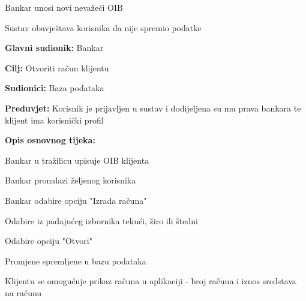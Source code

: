 \begin{packed_item}
\begin{packed_item}
\begin{packed_enum}
                  		
                  	\end{packed_enum}
                
                    \item[3.a] Bankar unosi novi nevažeći OIB
                    \item[] \begin{packed_enum}
                      
                      \item Sustav obavještava korisnika da nije spremio podatke
                      
                    \end{packed_enum}
                  
                \end{packed_item}
            \end{packed_item}
        
        
                
               \noindent {}
                \begin{packed_item}
            
                  \item \textbf{Glavni sudionik: }Bankar
                  \item  \textbf{Cilj:} Otvoriti račun klijentu
                  \item  \textbf{Sudionici:} Baza podataka
                  \item  \textbf{Preduvjet:} Korisnik je prijavljen u sustav i dodijeljena su mu prava bankara te klijent ima korisnički profil
                  \item  \textbf{Opis osnovnog tijeka:}
                  
                  \item[] \begin{packed_enum}
                
                	\item Bankar u tražilicu upisuje OIB klijenta
                	\item Bankar pronalazi željenog korisnika
                    \item Bankar odabire opciju "Izrada računa" 
                    \item Odabire iz padajućeg izbornika tekući, žiro ili štedni
                    \item Odabire opciju "Otvori"
                    \item Promjene spremljene u bazu podataka                 
                    \item Klijentu se omogućuje prikaz računa u aplikaciji - broj računa i iznos sredstava na računu
                   \end{packed_enum}
                  
                \end{packed_item}
                
